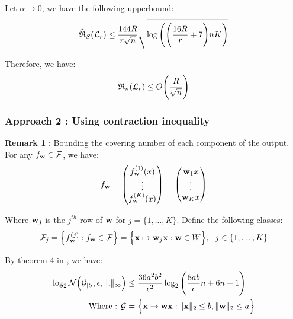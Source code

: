 \noindent Let $\alpha \to 0$, we have the following upperbound:
\begin{align*}
    \widehat{\mathfrak{R}}_S(\mathcal{L}_r) \le \frac{144R}{r\sqrt{n}}\sqrt{
        \log\Bigg( \Bigg( 
            \frac{16R}{r} + 7
         \Bigg)nK \Bigg)
    }
\end{align*}

\noindent Therefore, we have:
\begin{align*}
    \mathfrak{R}_n(\mathcal{L}_r) \le \tilde O\Bigg( \frac{R}{\sqrt{n}} \Bigg)
\end{align*}

\subsubsection{Approach 2 : Using contraction inequality}
\noindent\textbf{Remark 1} : Bounding the covering number of each component of the output.\newline
\noindent For any $f_{\bf w}\in\mathcal{F}$, we have:
\begin{align*}
    f_{\bf w} = \begin{pmatrix}
        f_{\bf w}^{(1)}(x) \\
        \vdots \\
        f_{\bf w}^{(K)}(x)
    \end{pmatrix}
    = 
    \begin{pmatrix}
        {\bf w}_{1}x \\
        \vdots \\
        {\bf w}_{K}x
    \end{pmatrix}
\end{align*}

\noindent Where ${\bf w}_j$ is the $j^{th}$ row of ${\bf w}$ for $j=\{1, \dots, K\}$. Define the following classes:
\begin{align*}
    \F_j = \bigCurl{f_\vecbf{w}^{(j)} : f_\vecbf{w} \in \F} = \bigCurl{\vecbf{x} \mapsto \vecbf{w}_j\vecbf{x} : \vecbf{w} \in W}, \ \ j \in \{1, \dots, K\}
\end{align*}

\noindent By theorem 4 in \cite{article:tong_zhang}, we have:
\begin{align*}
    \log_2\mathcal{N}\Big( 
        \mathcal{G}_{|S}, \epsilon, \|.\|_\infty
     \Big) &\le \frac{36a^2b^2}{\epsilon^2}\log_2\Bigg( 
        \frac{8ab}{\epsilon}n + 6n + 1
     \Bigg) \\
    \text{Where : } \mathcal{G} &=  \Big\{ 
        {\bf x} \to {\bf wx} : \|{\bf x}\|_2 \le b, \|{\bf w}\|_2 \le a
     \Big\}
\end{align*}

